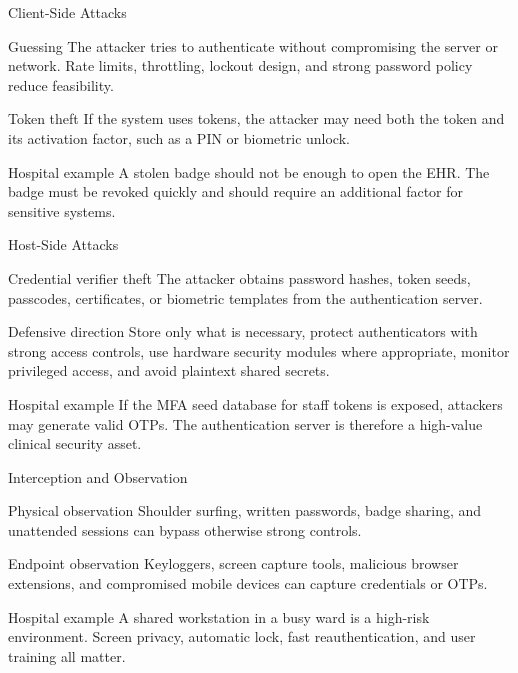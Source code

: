 \documentclass[presentation]{beamer}
\begin{document}
\begin{frame}[c]{Client-Side Attacks}
  \begin{block}{Guessing}
    The attacker tries to authenticate without compromising the server or network. Rate limits, throttling, lockout design, and strong password policy reduce feasibility.
  \end{block}

  \begin{block}{Token theft}
    If the system uses tokens, the attacker may need both the token and its activation factor, such as a PIN or biometric unlock.
  \end{block}

  \begin{exampleblock}{Hospital example}
    A stolen badge should not be enough to open the EHR. The badge must be revoked quickly and should require an additional factor for sensitive systems.
  \end{exampleblock}
\end{frame}

\begin{frame}[c]{Host-Side Attacks}
  \begin{block}{Credential verifier theft}
    The attacker obtains password hashes, token seeds, passcodes, certificates, or biometric templates from the authentication server.
  \end{block}

  \begin{block}{Defensive direction}
    Store only what is necessary, protect authenticators with strong access controls, use hardware security modules where appropriate, monitor privileged access, and avoid plaintext shared secrets.
  \end{block}

  \begin{exampleblock}{Hospital example}
    If the MFA seed database for staff tokens is exposed, attackers may generate valid OTPs. The authentication server is therefore a high-value clinical security asset.
  \end{exampleblock}
\end{frame}

\begin{frame}[c]{Interception and Observation}
  \begin{block}{Physical observation}
    Shoulder surfing, written passwords, badge sharing, and unattended sessions can bypass otherwise strong controls.
  \end{block}

  \begin{block}{Endpoint observation}
    Keyloggers, screen capture tools, malicious browser extensions, and compromised mobile devices can capture credentials or OTPs.
  \end{block}

  \begin{exampleblock}{Hospital example}
    A shared workstation in a busy ward is a high-risk environment. Screen privacy, automatic lock, fast reauthentication, and user training all matter.
  \end{exampleblock}
\end{frame}
\end{document}
